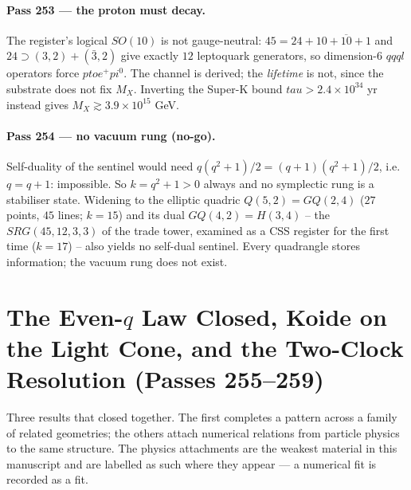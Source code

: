 \documentclass[12pt,a4paper]{article}
\def\pi{pi}%
\def\tau{tau}%
\def\to{ to }%
\theoremstyle{definition}
\begin{document}
\paragraph{Pass 253 --- the proton must decay.} The register's logical $SO(10)$
is not gauge-neutral: $45=24+10+\overline{10}+1$ and $24\supset(3,2)+(\bar3,2)$
give exactly $12$ leptoquark generators, so dimension-$6$ $qqql$ operators force
$p\to e^+\pi^0$. The channel is derived; the \emph{lifetime} is not, since the
substrate does not fix $M_X$. Inverting the Super-K bound $\tau>2.4\times10^{34}$
yr instead gives $M_X\gtrsim 3.9\times10^{15}$ GeV.

\paragraph{Pass 254 --- no vacuum rung (no-go).} Self-duality of the sentinel
would need $q(q^2+1)/2=(q+1)(q^2+1)/2$, i.e. $q=q+1$: impossible. So $k=q^2+1>0$
always and no symplectic rung is a stabiliser state. Widening to the elliptic
quadric $Q(5,2)=GQ(2,4)$ ($27$ points, $45$ lines; $k=15$) and its dual
$GQ(4,2)=H(3,4)$ -- the $SRG(45,12,3,3)$ of the trade tower, examined as a CSS
register for the first time ($k=17$) -- also yields no self-dual sentinel. Every
quadrangle stores information; the vacuum rung does not exist.


\section{The Even-$q$ Law Closed, Koide on the Light Cone, and the Two-Clock Resolution (Passes 255--259)}

\begin{plainbox}
Three results that closed together. The first completes a pattern across a family
of related geometries; the others attach numerical relations from particle physics to the
same structure. The physics attachments are the weakest material in this manuscript and are
labelled as such where they appear --- a numerical fit is recorded as a fit.
\end{plainbox}
\end{document}
